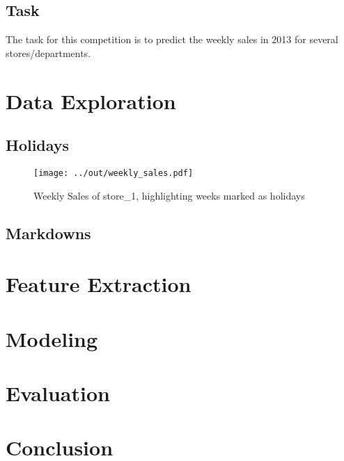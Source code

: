 \documentclass{article}
\begin{document}
\subsection{Task}
The task for this competition is to predict the weekly sales in 2013 for several stores/departments. 


\section{Data Exploration}

\subsection{Holidays}

\begin{figure}[H]
    \centering
    \captionsetup{width=.6\textwidth}
    \texttt{[image: ../out/weekly\_sales.pdf]}
    \caption{Weekly Sales of store\_1, highlighting weeks marked as holidays}
    \label{weekly_sales}
\end{figure}

\subsection{Markdowns}

\section{Feature Extraction}

\section{Modeling}

\section{Evaluation}

\section{Conclusion}





\end{document}
